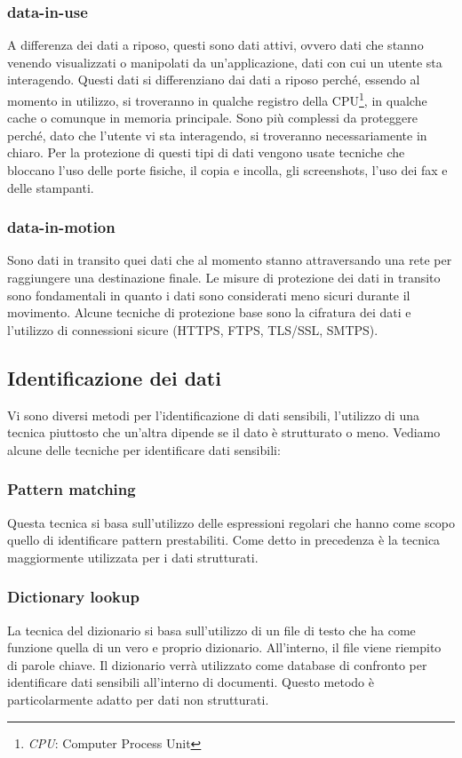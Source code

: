     \subsubsection{data-in-use}
        A differenza dei dati a riposo, questi sono dati attivi, ovvero dati che stanno venendo
        visualizzati o manipolati da un'applicazione, dati con cui un utente sta interagendo. 
        Questi dati si differenziano dai dati a riposo perché, essendo al momento in utilizzo, 
        si troveranno in qualche registro della CPU\footnote{\textit{CPU}: Computer Process Unit}, in qualche cache 
        o comunque in memoria principale. Sono più complessi da proteggere perché, dato che l'utente vi sta
        interagendo, si troveranno necessariamente in chiaro. Per la protezione di questi tipi di dati
        vengono usate tecniche che bloccano l'uso delle porte fisiche, il copia e incolla, gli screenshots, l'uso dei fax
        e delle stampanti.

    \subsubsection{data-in-motion}
        Sono dati in transito quei dati che al momento stanno attraversando una rete per raggiungere 
        una destinazione finale. Le misure di protezione dei dati in transito sono fondamentali in quanto
        i dati sono considerati meno sicuri durante il movimento.
        Alcune tecniche di protezione base sono la cifratura dei dati
        e l'utilizzo di connessioni sicure (HTTPS, FTPS, TLS/SSL, SMTPS).

\subsection{Identificazione dei dati}
    Vi sono diversi metodi per l'identificazione di dati sensibili, l'utilizzo di una tecnica piuttosto che
    un'altra dipende se il dato è strutturato o meno. Vediamo alcune delle tecniche per identificare
    dati sensibili:
    \subsubsection{Pattern matching}
    Questa tecnica si basa sull'utilizzo delle espressioni regolari che hanno come scopo quello
    di identificare pattern prestabiliti. Come detto in precedenza è la tecnica maggiormente 
    utilizzata per i dati strutturati. 

    \subsubsection{Dictionary lookup}
    La tecnica del dizionario si basa sull'utilizzo di un file di testo che ha come funzione quella
    di un vero e proprio dizionario. All'interno, il file viene riempito di parole chiave. 
    Il dizionario verrà utilizzato come database di confronto per identificare dati sensibili all'interno 
    di documenti. Questo metodo è particolarmente adatto per dati non strutturati.

